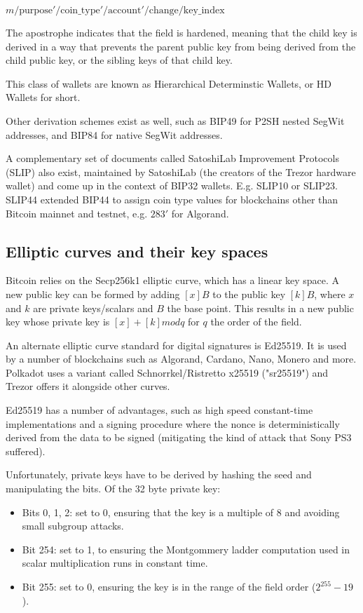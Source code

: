 \documentclass[12pt, a4paper, twocolumn]{article}
\begin{document}
$m / \text{purpose}' / \text{coin\_type}' / \text{account}' / \text{change} / \text{key\_index}$

The apostrophe indicates that the field is hardened, meaning that the child key is derived in a way that prevents the parent public key from being derived from the child public key, or the sibling keys of that child key.

This class of wallets are known as Hierarchical Determinstic Wallets, or HD Wallets for short.

Other derivation schemes exist as well, such as BIP49 for P2SH nested SegWit addresses, and BIP84 for native SegWit addresses.

A complementary set of documents called SatoshiLab Improvement Protocols (SLIP) also exist, maintained by SatoshiLab (the creators of the Trezor hardware wallet) and come up in the context of BIP32 wallets. E.g. SLIP10 or SLIP23. SLIP44 extended BIP44 to assign coin type values for blockchains other than Bitcoin mainnet and testnet, e.g. $\text{283}'$ for Algorand.

\subsection{Elliptic curves and their key spaces}

Bitcoin relies on the Secp256k1 elliptic curve, which has a linear key space. A new public key can be formed by adding $[x]B$ to the public key $[k]B$, where $x$ and $k$ are private keys/scalars and $B$ the base point. This results in a new public key whose private key is $[x] + [k] mod q$ for $q$ the order of the field.

An alternate elliptic curve standard for digital signatures is Ed25519. It is used by a number of blockchains such as Algorand, Cardano, Nano, Monero and more. Polkadot uses a variant called Schnorrkel/Ristretto x25519 ("sr25519") and Trezor offers it alongside other curves.

Ed25519 has a number of advantages, such as high speed constant-time implementations and a signing procedure where the nonce is deterministically derived from the data to be signed (mitigating the kind of attack that Sony PS3 suffered).

Unfortunately, private keys have to be derived by hashing the seed and manipulating the bits. Of the 32 byte private key:

\begin{itemize}
  \item Bits 0, 1, 2:  set to 0, ensuring that the key is a multiple of 8 and avoiding small subgroup attacks.
  \item Bit 254: set to 1, to ensuring the Montgommery ladder computation used in scalar multiplication runs in constant time.
  \item Bit 255: set to 0, ensuring the key is in the range of the field order ($2^{255} - 19$).
\end{itemize}
\end{document}
